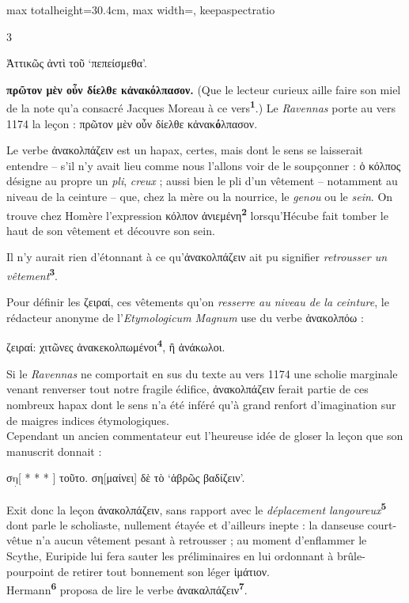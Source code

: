 \documentclass[11pt,twoside]{book}
\newcommand{\italique}[1]{\textit{#1}}
\newcommand{\citComm}[1]{\begin{quoting}[vskip=0.4pt,leftmargin=0.7em,rightmargin=0.2em]#1\end{quoting}}
\newcommand{\latin}[1]{\textit{#1}}
\newcommand{\douteux}[1]{$\underset{\cdot}{\text{#1}}$}
\newcommand{\marqueur}[1]{\textsuperscript{\color{rubricRed}\textbf{#1}}}
\begin{document}
\begin{adjustbox}{max totalheight=30.4cm, max width=\textwidth, keepaspectratio}
\begin{minipage}{\textwidth}
{\begin{multicols}{3}
\citComm{Ἀττικῶς ἀντὶ τοῦ `πεπείσμεθα'.}
\par\vspace{1.5pt}
 \textbf{πρῶτον μὲν οὖν δίελθε κἀνακόλπασον.} (Que le lecteur curieux aille faire son miel de la note qu'a consacré Jacques Moreau à ce vers\marqueur{1}.) Le \italique{Ravennas} porte au vers 1174 la leçon : πρῶτον μὲν οὖν δίελθε κἀνακ\textbf{ό}λπασον.
\par\vspace{1.5pt}
\noindent Le verbe ἀνακολπάζειν est un hapax, certes, mais dont le sens se laisserait entendre -- s'il n'y avait lieu comme nous l'allons voir de le soupçonner : ὁ κόλπος désigne au propre un \italique{pli}, \italique{creux} ; aussi bien le pli d'un vêtement -- notamment au niveau de la ceinture -- que, chez la mère ou la nourrice, le \italique{genou} ou le \italique{sein}. On trouve chez Homère l'expression κόλπον ἀνιεμένη\marqueur{2} lorsqu'Hécube fait tomber le haut de son vêtement et découvre son sein.
\par\vspace{1.5pt}
\noindent Il n'y aurait rien d'étonnant à ce qu'ἀνακολπάζειν ait pu signifier \italique{retrousser un vêtement}\marqueur{3}.
\par\vspace{1.5pt}
\noindent Pour définir les ζειραί, ces vêtements qu'on \italique{resserre au niveau de la ceinture}, le rédacteur anonyme de l'\latin{Etymologicum Magnum} use du verbe ἀνακολπόω :
\citComm{ζειραί: χιτῶνες ἀνακεκολπωμένοι\marqueur{4}, ἢ ἀνάκωλοι.}
\par\vspace{1.5pt}
\noindent Si le \italique{Ravennas} ne comportait en sus du texte au vers 1174 une scholie marginale venant renverser tout notre fragile édifice, ἀνακολπάζειν ferait partie de ces nombreux hapax dont le sens n'a été inféré qu'à grand renfort d'imagination sur de maigres indices étymologiques.\\ Cependant un ancien commentateur eut l'heureuse idée de gloser la leçon que son manuscrit donnait :
\citComm{σ\douteux{η}[ * * * ] τοῦτο. ση[μαίνει] δὲ τὸ `ἁβρῶς βαδίζειν'.}
\par\vspace{1.5pt}
\noindent Exit donc la leçon ἀνακολπάζειν, sans rapport avec le \italique{déplacement langoureux}\marqueur{5} dont parle le scholiaste, nullement étayée et d'ailleurs inepte : la danseuse court-vêtue n'a aucun vêtement pesant à retrousser ; au moment d'enflammer le Scythe, Euripide lui fera sauter les préliminaires en lui ordonnant à brûle-pourpoint de retirer tout bonnement son léger ἱμάτιον.\\ Hermann\marqueur{6} proposa de lire le verbe ἀνακαλπάζειν\marqueur{7}.

\end{multicols}}
\end{minipage}
\end{adjustbox}
\end{document}
